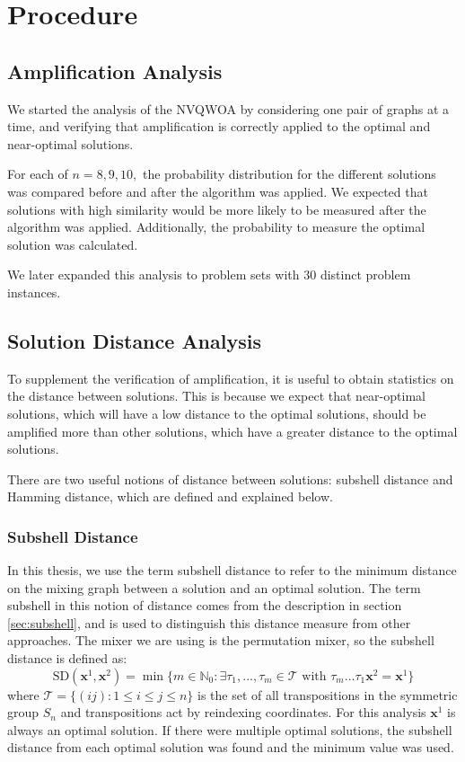\section{Procedure}
\subsection{Amplification Analysis}
We started the analysis of the NVQWOA by considering one pair of graphs at a time, and verifying that amplification is correctly applied to the optimal and near-optimal solutions.

For each of $n=8,9,10,$ the probability distribution for the different solutions was compared before and after the algorithm was applied. We expected that solutions with high similarity would be more likely to be measured after the algorithm was applied. Additionally, the probability to measure the optimal solution was calculated.

We later expanded this analysis to problem sets with 30 distinct problem instances.

\subsection{Solution Distance Analysis}
To supplement the verification of amplification, it is useful to obtain statistics on the distance between solutions. This is because we expect that near-optimal solutions, which will have a low distance to the optimal solutions, should be amplified more than other solutions, which have a greater distance to the optimal solutions.

There are two useful notions of distance between solutions: subshell distance and Hamming distance, which are defined and explained below.

\subsubsection{Subshell Distance}
In this thesis, we use the term subshell distance to refer to the minimum distance on the mixing graph between a solution and an optimal solution. The term subshell in this notion of distance comes from the description in section \ref{sec:subshell}, and is used to distinguish this distance measure from other approaches. The mixer we are using is the permutation mixer, so the subshell distance is defined as:
$$\text{SD}(\mathbf{x}^1,\mathbf{x}^2)=\min \{m\in \mathbb{N}_0: \exists \tau_1,...,\tau_m \in \mathcal{T} \text{ with } \tau_m ... \tau_1 \mathbf{x}^2 = \mathbf{x}^1\}$$
where $\mathcal{T}=\{(ij):1 \leq i \leq j \leq n \}$ is the set of all transpositions in the symmetric group $S_n$ and transpositions act by reindexing coordinates. For this analysis $\mathbf{x}^1$ is always an optimal solution. If there were multiple optimal solutions, the subshell distance from each optimal solution was found and the minimum value was used.

